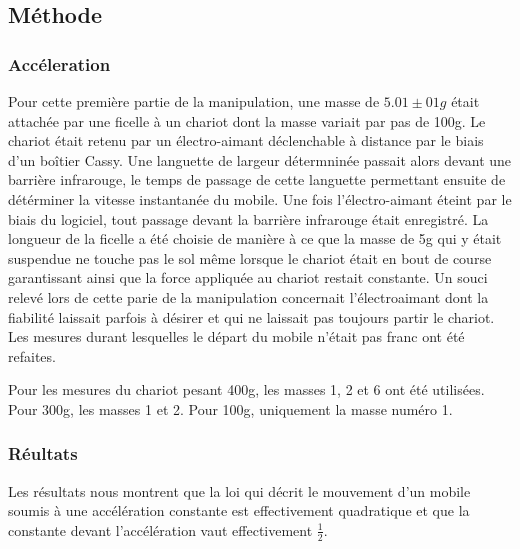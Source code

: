 \subsection{Méthode}

\subsubsection{Accéleration}
Pour cette première partie de la manipulation, une masse de $5.01 \pm 01g$ était attachée par une ficelle à un chariot dont la masse variait par pas de 100g. Le chariot était retenu par un électro-aimant déclenchable à distance par le biais d'un boîtier Cassy. Une languette de largeur détermninée passait alors devant une barrière infrarouge, le temps de passage de cette languette permettant ensuite de détérminer la vitesse instantanée du mobile. Une fois l'électro-aimant éteint par le biais du logiciel, tout passage devant la barrière infrarouge était enregistré.
La longueur de la ficelle a été choisie de manière à ce que la masse de 5g qui y était suspendue ne touche pas le sol même lorsque le chariot était en bout de course garantissant ainsi que la force appliquée au chariot restait constante.
Un souci relevé lors de cette parie de la manipulation concernait l'électroaimant dont la fiabilité laissait parfois à désirer et qui ne laissait pas toujours partir le chariot. Les mesures durant lesquelles le départ du mobile n'était pas franc ont été refaites.

Pour les mesures du chariot pesant 400g, les masses 1, 2 et 6 ont été utilisées. Pour 300g, les masses 1 et 2. Pour 100g, uniquement la masse numéro 1.

\subsubsection{Réultats}

Les résultats nous montrent que la loi qui décrit le mouvement d'un mobile soumis à une accélération constante est effectivement quadratique et que la constante devant l'accélération vaut effectivement $\frac{1}{2}$.

